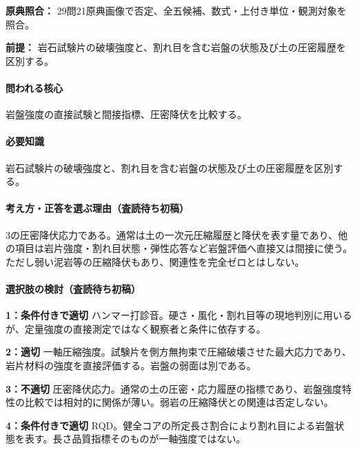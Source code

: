 \noindent\textbf{原典照合：} 29問21原典画像で否定、全五候補、数式・上付き単位・観測対象を照合。\par

\noindent\textbf{前提：} 岩石試験片の破壊強度と、割れ目を含む岩盤の状態及び土の圧密履歴を区別する。\par

\paragraph{問われる核心} 岩盤強度の直接試験と間接指標、圧密降伏を比較する。

\paragraph{必要知識} 岩石試験片の破壊強度と、割れ目を含む岩盤の状態及び土の圧密履歴を区別する。

\paragraph{考え方・正答を選ぶ理由（査読待ち初稿）} 3の圧密降伏応力である。通常は土の一次元圧縮履歴と降伏を表す量であり、他の項目は岩片強度・割れ目状態・弾性応答など岩盤評価へ直接又は間接に使う。ただし弱い泥岩等の圧縮降伏もあり、関連性を完全ゼロとはしない。

\paragraph{選択肢の検討（査読待ち初稿）}\mbox{}\par

\noindent\textbf{1：条件付きで適切} ハンマー打診音。硬さ・風化・割れ目等の現地判別に用いるが、定量強度の直接測定ではなく観察者と条件に依存する。\par

\noindent\textbf{2：適切} 一軸圧縮強度。試験片を側方無拘束で圧縮破壊させた最大応力であり、岩片材料の強度を直接評価する。岩盤の弱面は別である。\par

\noindent\textbf{3：不適切} 圧密降伏応力。通常の土の圧密・応力履歴の指標であり、岩盤強度特性の比較では相対的に関係が薄い。弱岩の圧縮降伏との関連は否定しない。\par

\noindent\textbf{4：条件付きで適切} RQD。健全コアの所定長さ割合により割れ目による岩盤状態を表す。長さ品質指標そのものが一軸強度ではない。\par


